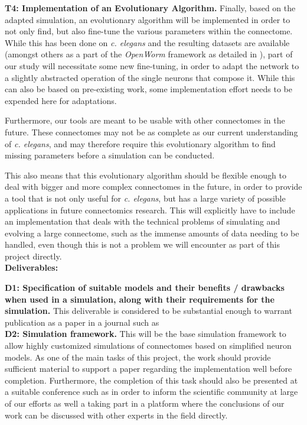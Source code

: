 \documentclass[a4paper,11pt]{article}
\begin{document}
\textbf{T4: Implementation of an Evolutionary Algorithm.}
Finally, based on the adapted simulation, an evolutionary algorithm will be implemented in order to not only find, but also fine-tune the various parameters within the connectome. While this has been done on \emph{c. elegans} and the resulting datasets are available (amongst others as a part of the \emph{OpenWorm} framework as detailed in \citep{Szigeti2014}), part of our study will necessitate some new fine-tuning, in order to adapt the network to a slightly abstracted operation of the single neurons that compose it. While this can also be based on pre-existing work, some implementation effort needs to be expended here for adaptations.

Furthermore, our tools are meant to be usable with other connectomes in the future. These connectomes may not be as complete as our current understanding of \emph{c. elegans}, and may therefore require this evolutionary algorithm to find missing parameters before a simulation can be conducted.

This also means that this evolutionary algorithm should be flexible enough to deal with bigger and more complex connectomes in the future, in order to provide a tool that is not only useful for \emph{c. elegans}, but has a large variety of possible applications in future connectomics research. This will explicitly have to include an implementation that deals with the technical problems of simulating and evolving a large connectome, such as the immense amounts of data needing to be handled, even though this is not a problem we will encounter as part of this project directly.
\\[0,2cm]

\textbf{Deliverables:}

\textbf{D1: Specification of suitable models and their benefits / drawbacks when used in a simulation, along with their requirements for the simulation.} This deliverable is considered to be substantial enough to warrant publication as a paper in a journal such as 
\\[0,2cm]

\textbf{D2: Simulation framework.} This will be the base simulation framework to allow highly customized simulations of connectomes based on simplified neuron models. As one of the main tasks of this project, the work should provide sufficient material to support a paper regarding the implementation well before completion. Furthermore, the completion of this task should also be presented at a suitable conference such as  in order to inform the scientific community at large of our efforts as well a taking part in a platform where the conclusions of our work can be discussed with other experts in the field directly.
\\[0,2cm]
\end{document}
